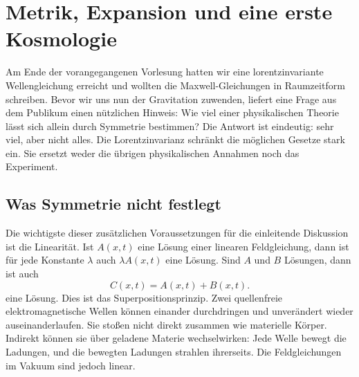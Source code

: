 \chapter{Metrik, Expansion und eine erste Kosmologie}

Am Ende der vorangegangenen Vorlesung hatten wir eine lorentzinvariante Wellengleichung erreicht und wollten die Maxwell-Gleichungen in Raumzeitform schreiben. Bevor wir uns nun der Gravitation zuwenden, liefert eine Frage aus dem Publikum einen nützlichen Hinweis: Wie viel einer physikalischen Theorie lässt sich allein durch Symmetrie bestimmen? Die Antwort ist eindeutig: sehr viel, aber nicht alles. Die Lorentzinvarianz schränkt die möglichen Gesetze stark ein. Sie ersetzt weder die übrigen physikalischen Annahmen noch das Experiment.

\section{Was Symmetrie nicht festlegt}

\begin{classroomqa}
\end{classroomqa}

Die wichtigste dieser zusätzlichen Voraussetzungen für die einleitende Diskussion ist die Linearität. Ist \(A(x,t)\) eine Lösung einer linearen Feldgleichung, dann ist für jede Konstante \(\lambda\) auch \(\lambda A(x,t)\) eine Lösung. Sind \(A\) und \(B\) Lösungen, dann ist auch \begin{equation}
  C(x,t)=A(x,t)+B(x,t).
  \label{eq:superposition}
\end{equation} eine Lösung.
Dies ist das Superpositionsprinzip. Zwei quellenfreie elektromagnetische Wellen können einander durchdringen und unverändert wieder auseinanderlaufen. Sie stoßen nicht direkt zusammen wie materielle Körper. Indirekt können sie über geladene Materie wechselwirken: Jede Welle bewegt die Ladungen, und die bewegten Ladungen strahlen ihrerseits. Die Feldgleichungen im Vakuum sind jedoch linear.

